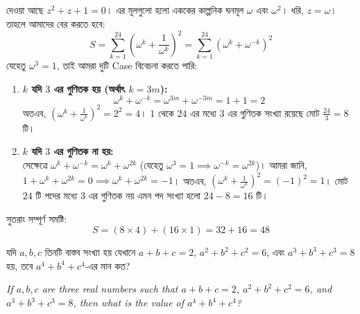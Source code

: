 \documentclass[12pt, a4paper]{article}
\begin{document}
\begin{tcolorbox}[solutionbox={সমাধান (Solution)}]
    \noindent
    দেওয়া আছে $z^2 + z + 1 = 0$। এর মূলগুলো হলো এককের কাল্পনিক ঘনমূল $\omega$ এবং $\omega^2$। 
    ধরি, $z = \omega$। তাহলে আমাদের বের করতে হবে:
    \[ S = \sum_{k=1}^{24} \left(\omega^k + \frac{1}{\omega^k}\right)^2 = \sum_{k=1}^{24} \left(\omega^k + \omega^{-k}\right)^2 \]
    যেহেতু $\omega^3 = 1$, তাই আমরা দুটি Case বিবেচনা করতে পারি:
    
    \vspace{0.5em}
    \begin{enumerate}[itemsep=0.4em]
        \item \textbf{$k$ যদি $3$ এর গুণিতক হয় (অর্থাৎ $k = 3m$):} \\
        \[ \omega^k + \omega^{-k} = \omega^{3m} + \omega^{-3m} = 1 + 1 = 2 \]
        অতএব, $\left(\omega^k + \frac{1}{\omega^k}\right)^2 = 2^2 = 4$। 
        $1$ থেকে $24$ এর মধ্যে $3$ এর গুণিতক সংখ্যা রয়েছে মোট $\frac{24}{3} = 8$ টি।
        
        \item \textbf{$k$ যদি $3$ এর গুণিতক না হয়:} \\
        সেক্ষেত্রে $\omega^k + \omega^{-k} = \omega^k + \omega^{2k}$ (যেহেতু $\omega^3 = 1 \implies \omega^{-k} = \omega^{2k}$)। 
        আমরা জানি, $1 + \omega^k + \omega^{2k} = 0 \implies \omega^k + \omega^{2k} = -1$। 
        অতএব, $\left(\omega^k + \frac{1}{\omega^k}\right)^2 = (-1)^2 = 1$। 
        মোট $24$ টি পদের মধ্যে $3$ এর গুণিতক নয় এমন পদ সংখ্যা হলো $24 - 8 = 16$ টি।
    \end{enumerate}
    
    \vspace{0.5em}
    সুতরাং সম্পূর্ণ সমষ্টি:
    \[ S = (8 \times 4) + (16 \times 1) = 32 + 16 = 48 \]
\end{tcolorbox}
\begin{tcolorbox}[questionbox={প্রশ্ন (Question) 34}]
    \noindent
    যদি $a, b, c$ তিনটি বাস্তব সংখ্যা হয় যেখানে $a+b+c = 2$, $a^2+b^2+c^2 = 6$, এবং $a^3+b^3+c^3 = 8$ হয়, তবে $a^4+b^4+c^4$-এর মান কত?
    
    \vspace{0.8em}
    \begin{english}
    \noindent\textit{\color{darkgray}
    If $a, b, c$ are three real numbers such that $a+b+c = 2$, $a^2+b^2+c^2 = 6$, and $a^3+b^3+c^3 = 8$, then what is the value of $a^4+b^4+c^4$?
    }
    \end{english}
\end{tcolorbox}
\end{document}
